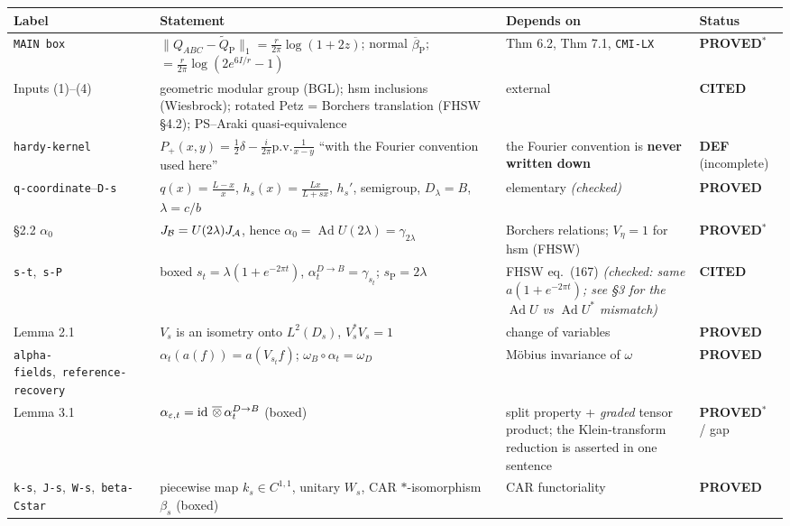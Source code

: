 \documentclass[11pt]{article}
\newcommand{\stPR}{{\color{okgreen}\textsf{\scriptsize\bfseries PROVED}}}
\newcommand{\stPMC}{{\color{teal}\textsf{\scriptsize\bfseries PROVED$^\ast$}}}
\newcommand{\stCIT}{{\color{navy}\textsf{\scriptsize\bfseries CITED}}}
\newcommand{\stDEF}{{\textsf{\scriptsize\bfseries DEF}}}
\newcommand{\CMI}{I}
\renewcommand{\cB}{\mathcal B}
\newcommand{\id}{\operatorname{id}}
\newcommand{\Ad}{\operatorname{Ad}}
\newcommand{\pv}{\mathrm{p.v.}}
\newcommand{\Ord}{\mathrm{P}}
\begin{document}
{\footnotesize\setlength{\emergencystretch}{4em}\sloppy{}\relax{}\relax
\begin{tabularx}{\textwidth}{L{0.155\textwidth} X L{0.210\textwidth} L{0.098\textwidth}}
\toprule
\textbf{Label} & \textbf{Statement} & \textbf{Depends on} & \textbf{Status}\\
\midrule\endhead
\texttt{MAIN box} & $\|Q_{ABC}-\widetilde Q_\Ord\|_1=\frac r{2\pi}\log(1{+}2z)$; normal $\overline\beta_\Ord$; $=\frac r{2\pi}\log(2e^{6\CMI/r}{-}1)$ & Thm 6.2, Thm 7.1, \texttt{CMI-LX} & \stPMC \\
Inputs (1)--(4) & geometric modular group (BGL); hsm inclusions (Wiesbrock); rotated Petz = Borchers translation (FHSW \S4.2); PS--Araki quasi-equivalence & external & \stCIT \\
\texttt{hardy-kernel} & $P_+(x,y)=\frac12\delta-\frac i{2\pi}\pv\frac1{x-y}$ ``with the Fourier convention used here'' & the Fourier convention is \textbf{never written down} & \stDEF{} (incomplete) \\
\texttt{q-coordinate}--\texttt{D-s} & $q(x)=\frac{L-x}x$, $h_s(x)=\frac{Lx}{L+sx}$, $h_s'$, semigroup, $D_\lambda=B$, $\lambda=c/b$ & elementary \emph{(checked)} & \stPR \\
\S2.2 $\alpha_0$ & $J_\cB=U(2\lambda)J_\cA$, hence $\alpha_0=\Ad U(2\lambda)=\gamma_{2\lambda}$ & Borchers relations; $V_\eta=1$ for hsm (FHSW) & \stPMC \\
\texttt{s-t},\allowbreak\ \texttt{s-P} & boxed $s_t=\lambda(1+e^{-2\pi t})$, $\alpha^{D\to B}_t=\gamma_{s_t}$; $s_\Ord=2\lambda$ & FHSW eq.~(167) \emph{(checked: same $a(1+e^{-2\pi t})$; see \S3 for the $\Ad U$ vs $\Ad U^*$ mismatch)} & \stCIT \\
Lemma 2.1 & $V_s$ is an isometry onto $L^2(D_s)$, $V_s^*V_s=1$ & change of variables & \stPR \\
\texttt{alpha-fields},\allowbreak\ \texttt{reference-\allowbreak recovery} & $\alpha_t(a(f))=a(V_{s_t}f)$; $\omega_B\circ\alpha_t=\omega_D$ & M\"obius invariance of $\omega$ & \stPR \\
Lemma 3.1 & $\alpha_{\eps,t}=\id\,\overline\otimes\,\alpha^{D\to B}_t$ (boxed) & split property + \emph{graded} tensor product; the Klein-transform reduction is asserted in one sentence & \stPMC{} / gap \\
\texttt{k-s},\allowbreak\ \texttt{J-s},\allowbreak\ \texttt{W-s},\allowbreak\ \texttt{beta-Cstar} & piecewise map $k_s\in C^{1,1}$, unitary $W_s$, CAR $*$-isomorphism $\beta_s$ (boxed) & CAR functoriality & \stPR \\

\end{tabularx}}
\end{document}
